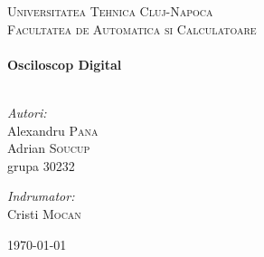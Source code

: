\begin{titlepage}
\begin{center}

\textsc{\LARGE Universitatea Tehnica Cluj-Napoca}\\[1.5cm]

\textsc{\Large Facultatea de Automatica si Calculatoare}\\[0.5cm]

\HRule \\[0.4cm]
{ \huge \bfseries Osciloscop Digital}\\[0.4cm]

\HRule \\[1.5cm]

\begin{minipage}[t]{0.4\textwidth}
\begin{flushleft} \large
\emph{Autori:}\\
Alexandru \textsc{Pana}\\
Adrian \textsc{Soucup}\\
grupa 30232
\end{flushleft}
\end{minipage}
\begin{minipage}[t]{0.4\textwidth}
\begin{flushright} \large
\emph{Indrumator:} \\
Cristi \textsc{Mocan}
\end{flushright}
\end{minipage}
\vfill

{\large \today}

\end{center}
\end{titlepage}